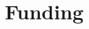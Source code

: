 \documentclass[10pt, letterpaper]{article}
\newcommand{\years}[1]{\marginnote{\small #1}}
\begin{document}


\section*{Funding}

\end{document}
